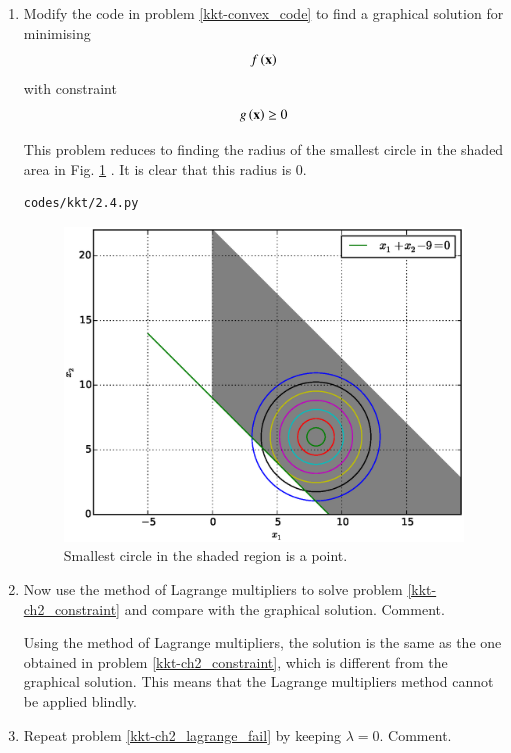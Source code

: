 

\begin{enumerate}[label=\thesubsection.\arabic*,ref=\thesubsection.\theenumi]
%
\item
\label{kkt-ch2_constraint}
Modify the code in problem \ref{kkt-convex_code} to find a graphical solution for minimising
\begin{align}
f\left(\mathbf{x}\right) 
\end{align}
with constraint
\begin{align}
g\left(\mathbf{x}\right) \geq 0
\end{align}

\solution 
This problem reduces to finding the radius of the smallest circle in the shaded area in Fig. \ref{kkt-fig.2.4} .  It is clear that this radius is 0.
%	
\begin{lstlisting}
codes/kkt/2.4.py
\end{lstlisting}

%
\begin{figure}[!ht]
\centering
\includegraphics[width=\columnwidth]{./figs/kkt/2.4.eps}
\caption{ Smallest circle in the shaded region is a point.}
\label{kkt-fig.2.4}	
\end{figure}
%
\item
\label{kkt-ch2_lagrange_fail}
Now use the method of Lagrange multipliers to solve  problem \ref{kkt-ch2_constraint} and compare with the graphical solution.  Comment.

%
\solution Using the method of Lagrange multipliers, the solution is the same as the one obtained in  problem \ref{kkt-ch2_constraint}, which is different from the graphical solution.  This means that the Lagrange multipliers method cannot be applied blindly.
\item
Repeat problem \ref{kkt-ch2_lagrange_fail} by keeping 
 $\lambda=0$.   Comment.


\end{enumerate}
